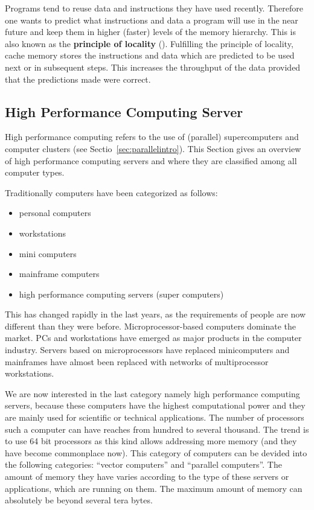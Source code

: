 Programs tend to reuse data and instructions they have used
recently. Therefore one wants to predict what instructions and data a
program will use in the near future and keep them in higher (faster)
levels of the memory hierarchy. This is also known as the
\textbf{principle of locality} (\cite{C1quant07}). Fulfilling the
principle of locality, cache memory stores the 
instructions and data which are predicted to be used next or in
subsequent steps. This increases the throughput of the data provided that
the predictions made were correct.

\subsection{High Performance Computing Server}
\label{sec:hpcserver}

High performance computing refers to the use of (parallel)
supercomputers and computer clusters (see
Sectio~\ref{sec:parallelintro}). This Section gives an overview of
high performance computing servers and where they are classified
among all computer types.


Traditionally computers have been categorized as follows:
\begin{itemize}
\item personal computers
\item workstations
\item mini computers
\item mainframe computers
\item high performance computing servers (super computers)
\end{itemize}

This has changed rapidly in the last years, as the requirements of
people are now different than they were before. Microprocessor-based
computers dominate the market. PCs and workstations have emerged as
major products in the computer industry. Servers based on
microprocessors have replaced minicomputers and mainframes have almost
been replaced with networks of multiprocessor workstations.

We are now interested in the last category namely high performance
computing servers, because these computers have the highest
computational power and they are mainly used
for scientific or technical applications. The number of processors
such a computer can have reaches from hundred to several thousand. The
trend is to use 64 bit processors as this kind allows addressing more
memory (and they have become commonplace now). 
This category of computers can be devided into the following
categories: ``vector computers'' and ``parallel computers''.
The amount of memory they have varies according to the type of
these servers or applications, which are running on them. The maximum
amount of memory can absolutely be beyond several tera bytes.  

